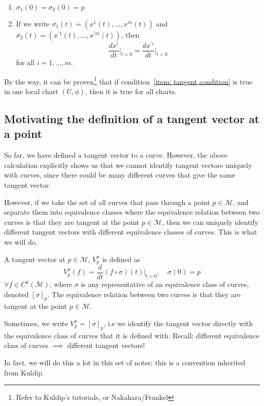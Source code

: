       \begin{enumerate}
        \item{$\sigma_1(0) = \sigma_2(0) = p$}
        \item{\label{item: tangent condition}If we write $\bar{\sigma_1}(t)
        = \left(x^1(t),...,x^m(t)\right)$ and $\bar{\sigma_2}(t) =
        \left(x^{\prime 1}(t),...,x^{\prime m}(t)\right)$, then
        \begin{equation*}
          \frac{dx^i}{dt}\Bigr|_{t=0} = \frac{dx^{\prime i}}{dt}\Bigr|_{t=0}
        \end{equation*}}
        for all $i = 1,...,m$.
      \end{enumerate}
    By the way, it can be proven\footnote{Refer to Kuldip's tutorials, or
    Nakahara/Frankel} that if condition~\ref{item: tangent condition} is
    true in one local chart $(U,\phi)$, then it is true for all charts. 
    
    \subsection{Motivating the definition of a tangent vector at a point}
      So far, we have defined a tangent vector to a curve. However, the
      above calculation explicitly shows us that we cannot identify tangent
      vectors uniquely with curves, since there could be many different
      curves that give the same tangent vector.
      
      However, if we take the set of all curves that pass through a point
      $p\in \mathcal{M}$, and separate them into equivalence classes where
      the equivalence relation between two curves is that they are tangent
      at the point $p\in \mathcal{M}$, then we can uniquely identify
      different tangent vectors with different equivalence classes of
      curves. This is what we will do.

    \begin{definition}
      \label{defn: Tangent vector at a point}
      A tangent vector at $p \in \mathcal{M}$, $V^{\sigma}_{p}$ is defined
      as \begin{equation*}
          V^{\sigma}_{p}(f) = \frac{d}{dt}(f\circ\sigma)(t)\Bigr|_{t=0},
          \quad \sigma(0) = p
        \end{equation*}
      $\forall f\in C^k(\mathcal{M})$, where $\sigma$ is any representative
      of an equivalence class of curves, denoted $[\sigma]_p$. The
      equivalence relation between two curves is that they are tangent at
      the point $p\in \mathcal{M}$.
    \end{definition}
    \begin{remark}
      Sometimes, we write $V^{\sigma}_{p} = [\sigma]_p$, i.e we identify
      the tangent vector directly with the equivalence class of curves that
      it is defined with. Recall: different equivalence class of curves
      $\implies$ different tangent vectors!

      In fact, we will do this a lot in this set of notes; this is a convention inherited from Kuldip.
    \end{remark}
